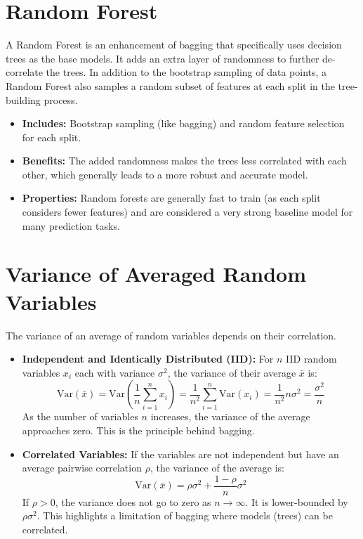 \documentclass{article}
\begin{document}
\begin{multicols}{2}
	\section{Random Forest}
	A Random Forest is an enhancement of bagging that specifically uses decision trees as the base models. It adds an extra layer of randomness to further de-correlate the trees.
	In addition to the bootstrap sampling of data points, a Random Forest also samples a random subset of features at each split in the tree-building process.
	\begin{itemize}
		\item \textbf{Includes:} Bootstrap sampling (like bagging) and random feature selection for each split.
		\item \textbf{Benefits:} The added randomness makes the trees less correlated with each other, which generally leads to a more robust and accurate model.
		\item \textbf{Properties:} Random forests are generally fast to train (as each split considers fewer features) and are considered a very strong baseline model for many prediction tasks.
	\end{itemize}


	\section{Variance of Averaged Random Variables}
	The variance of an average of random variables depends on their correlation.

	\begin{itemize}
		\item \textbf{Independent and Identically Distributed (IID):} For $n$ IID random variables $x_i$ each with variance $\sigma^2$, the variance of their average $\bar{x}$ is:
		      $$ \text{Var}(\bar{x}) = \text{Var}\left(\frac{1}{n}\sum_{i=1}^{n} x_i\right) = \frac{1}{n^2}\sum_{i=1}^{n}\text{Var}(x_i) = \frac{1}{n^2} n\sigma^2 = \frac{\sigma^2}{n} $$
		      As the number of variables $n$ increases, the variance of the average approaches zero. This is the principle behind bagging.

		\item \textbf{Correlated Variables:} If the variables are not independent but have an average pairwise correlation $\rho$, the variance of the average is:
		      $$ \text{Var}(\bar{x}) = \rho\sigma^2 + \frac{1-\rho}{n}\sigma^2 $$
		      If $\rho > 0$, the variance does not go to zero as $n \to \infty$. It is lower-bounded by $\rho\sigma^2$. This highlights a limitation of bagging where models (trees) can be correlated.
	\end{itemize}


\end{multicols}
\end{document}
